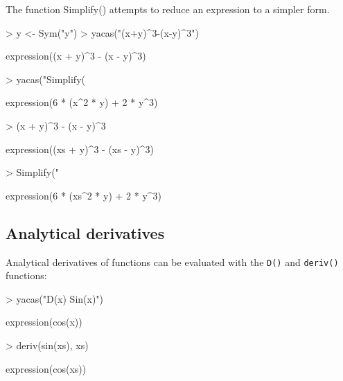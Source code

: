 \documentclass[]{article}
\newcommand{\code}[1]{{\tt #1}}
\begin{document}
The function Simplify() attempts to reduce an expression
to a simpler form. 
\begin{Schunk}
\begin{Sinput}
> y <- Sym("y")
> yacas("(x+y)^3-(x-y)^3")
\end{Sinput}
\begin{Soutput}
expression((x + y)^3 - (x - y)^3)
\end{Soutput}
\begin{Sinput}
> yacas("Simplify(%)")
\end{Sinput}
\begin{Soutput}
expression(6 * (x^2 * y) + 2 * y^3)
\end{Soutput}
\end{Schunk}

\begin{Schunk}
\begin{Sinput}
> (x + y)^3 - (x - y)^3
\end{Sinput}
\begin{Soutput}
expression((xs + y)^3 - (xs - y)^3)
\end{Soutput}
\begin{Sinput}
> Simplify("%")
\end{Sinput}
\begin{Soutput}
expression(6 * (xs^2 * y) + 2 * y^3)
\end{Soutput}
\end{Schunk}


\subsection{Analytical derivatives}

Analytical derivatives of functions can be evaluated with the
\code{D()} and \code{deriv()} functions:
\begin{Schunk}
\begin{Sinput}
> yacas("D(x) Sin(x)")
\end{Sinput}
\begin{Soutput}
expression(cos(x))
\end{Soutput}
\end{Schunk}

\begin{Schunk}
\begin{Sinput}
> deriv(sin(xs), xs)
\end{Sinput}
\begin{Soutput}
expression(cos(xs))
\end{Soutput}
\end{Schunk}
\end{document}
